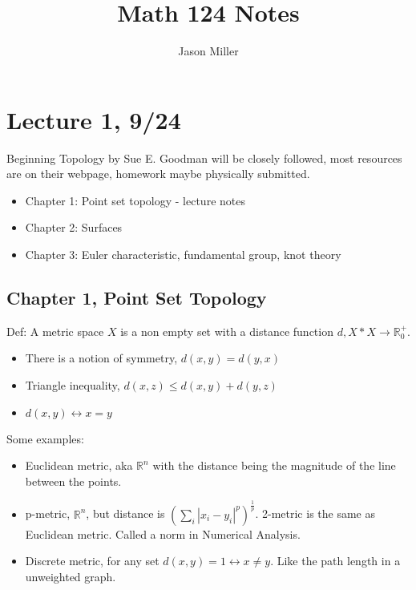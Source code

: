 \documentclass[12pt]{article}
\begin{document}
\title{Math 124 Notes}
\author{Jason Miller}
\maketitle 

\tableofcontents

\newpage 
\section{Lecture 1, 9/24}
Beginning Topology by Sue E. Goodman will be closely followed, most resources are on their webpage, homework maybe physically submitted.  
\begin{itemize}
\item Chapter 1: Point set topology - lecture notes
\item Chapter 2: Surfaces 
\item Chapter 3: Euler characteristic, fundamental group, knot theory 

\end{itemize}
\subsection{Chapter 1, Point Set Topology}
Def: A metric space $X$ is a non empty set with a distance function $d, X*X 
\rightarrow \mathbb{R}^+_0$.\\
\begin{itemize}
\item There is a notion of symmetry, $d(x,y) = d(y,x)$
\item Triangle inequality, $d(x,z) \leq d(x,y) + d(y,z)$
\item $d(x,y) \longleftrightarrow x = y$ 
\end{itemize}

Some examples:
\begin{itemize}
\item Euclidean metric, aka $\mathbb{R}^n$ with the distance being the magnitude of the line between the points.
\item p-metric, $\mathbb{R}^n$, but distance is $(\sum_i |x_i - y_i|^p)^{\frac{1}{p}}$. 2-metric is the same as Euclidean metric. Called a norm in Numerical Analysis. 
\item Discrete metric, for any set $d(x,y) = 1 \longleftrightarrow x \neq y$. Like the path length in a unweighted graph. 
\end{itemize} 
\end{document}
